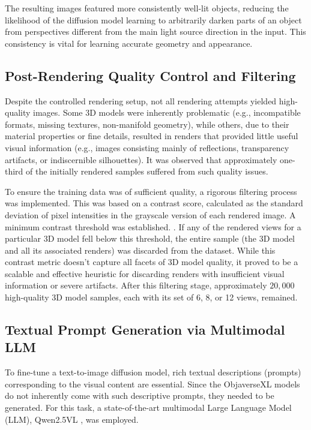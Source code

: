 The resulting images featured more consistently well-lit objects, reducing the likelihood of the diffusion model learning to arbitrarily darken parts of an object from perspectives different from the main light source direction in the input. This consistency is vital for learning accurate geometry and appearance.

\subsection{Post-Rendering Quality Control and Filtering}\label{ssec:quality-control}
Despite the controlled rendering setup, not all rendering attempts yielded high-quality images. Some 3D models were inherently problematic (e.g., incompatible formats, missing textures, non-manifold geometry), while others, due to their material properties or fine details, resulted in renders that provided little useful visual information (e.g., images consisting mainly of reflections, transparency artifacts, or indiscernible silhouettes). It was observed that approximately one-third of the initially rendered samples suffered from such quality issues.

To ensure the training data was of sufficient quality, a rigorous filtering process was implemented. This was based on a contrast score, calculated as the standard deviation of pixel intensities in the grayscale version of each rendered image. A minimum contrast threshold was established. . If any of the rendered views for a particular 3D model fell below this threshold, the entire sample (the 3D model and all its associated renders) was discarded from the dataset. While this contrast metric doesn't capture all facets of 3D model quality, it proved to be a scalable and effective heuristic for discarding renders with insufficient visual information or severe artifacts. After this filtering stage, approximately $20,000$ high-quality 3D model samples, each with its set of 6, 8, or 12 views, remained.

\subsection{Textual Prompt Generation via Multimodal LLM}\label{ssec:text-generation}
To fine-tune a text-to-image diffusion model, rich textual descriptions (prompts) corresponding to the visual content are essential. Since the ObjaverseXL models do not inherently come with such descriptive prompts, they needed to be generated. For this task, a state-of-the-art multimodal Large Language Model (LLM), Qwen2.5VL \cite{qwen25vl}, was employed.

